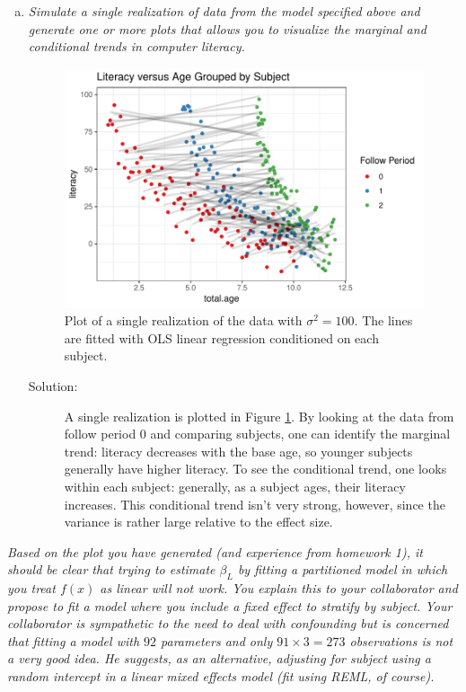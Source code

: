 \documentclass[11pt, letterpaper]{article}
\begin{document}
\begin{enumerate}[(a)]
\item{\em  Simulate a single realization of data from the model specified above and generate one or more plots that 
    allows you to visualize the marginal and conditional trends in computer literacy.}

  \begin{figure}
    \centering
    \includegraphics{literacy_versus_age.pdf}
    \caption{Plot of a single realization of the data with $\sigma^2 = 100$. The
      lines are fitted with OLS linear regression conditioned on each subject.}
    \label{fig:literacy_versus_age}
  \end{figure}

  \begin{description}
  \item[Solution:] A single realization is plotted in Figure
    \ref{fig:literacy_versus_age}. By looking at the data from follow period $0$
    and comparing subjects, one can identify the marginal trend: literacy
    decreases with the base age, so younger subjects generally have higher
    literacy. To see the conditional trend, one looks within each subject:
    generally, as a subject ages, their literacy increases. This conditional
    trend isn't very strong, however, since the variance is rather large
    relative to the effect size.
  \end{description}
  
\end{enumerate}
{\em Based on the plot you have generated (and experience from homework 1), it should be clear that
trying to estimate $\beta_L$ by fitting a partitioned model in which you treat $f(x)$ as linear will not work.  
You explain this to your collaborator and propose to fit a model where you include a fixed effect to stratify by
subject.  Your collaborator is sympathetic to the need to deal with confounding but is concerned that fitting a model with $92$ parameters and only $91 \times 3=273$ observations is not a very good idea.  He suggests,
as an alternative, adjusting for subject using a random intercept in a linear mixed effects model (fit using REML, of course).}
\end{document}
